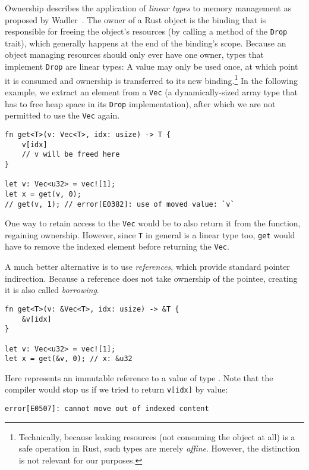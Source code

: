 Ownership describes the application of \emph{linear types} to memory management
as proposed by Wadler~\cite{wadler1990linear}. The owner of a Rust object is the binding that is responsible for freeing the
object's resources (by calling a method of the \texttt{Drop} trait), which
generally happens at the end of the binding's scope.
Because an object managing resources should only ever have one owner, types that implement
\texttt{Drop} are linear types: A value may only be used once, at which point it is
consumed and ownership is transferred to its new binding.\footnote{Technically,
  because leaking resources (\ie not consuming the object at all) is a safe operation in Rust, such types are merely
  \emph{affine}. However, the distinction is not relevant for our purposes.
} In the following example, we extract an element from a \texttt{Vec} (a dynamically-sized array
type that has to free heap space in its \texttt{Drop} implementation), after which we are not permitted to use the \texttt{Vec} again.

\begin{verbatim}
fn get<T>(v: Vec<T>, idx: usize) -> T {
    v[idx]
    // v will be freed here
}

let v: Vec<u32> = vec![1];
let x = get(v, 0);
// get(v, 1); // error[E0382]: use of moved value: `v`
\end{verbatim}

One way to retain access to the \texttt{Vec} would be to also return it from the
function, regaining ownership. However, since \texttt{T} in general is a linear
type too, \texttt{get} would have to remove the indexed element before returning
the \texttt{Vec}.

A much better alternative is to use \emph{references}, which provide standard
pointer indirection. Because a reference does not take ownership of the pointee,
creating it is also called \emph{borrowing}.

\begin{verbatim}
fn get<T>(v: &Vec<T>, idx: usize) -> &T {
    &v[idx]
}

let v: Vec<u32> = vec![1];
let x = get(&v, 0); // x: &u32
\end{verbatim}

Here  represents an immutable reference to a value of type . Note that the compiler would stop us if we tried to return \texttt{v[idx]} by value:

\begin{verbatim}
error[E0507]: cannot move out of indexed content
\end{verbatim}

